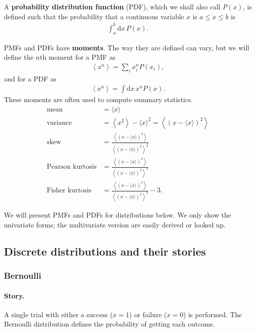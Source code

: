 A \textbf{probability distribution function} (PDF), which we shall
also call $P(x)$, is defined such that the probability that a
continuous variable $x$ is $a \le x \le b$ is
\begin{align}
\int_a^b \mathrm{d}x\,P(x).
\end{align}

PMFs and PDFs have \textbf{moments}.  The way they are defined can
vary, but we will define the $n$th moment for a PMF as
\begin{align}
\left\langle x^n \right\rangle = \sum_i x_i^n P(x_i),
\end{align}
and for a PDF as
\begin{align}
\left\langle x^n \right\rangle = \int \mathrm{d}x\, x^n P(x).
\end{align}
These moments are often used to compute summary statistics.
\begin{align}
\text{mean} &= \langle x \rangle \\
\text{variance} &= \left\langle x^2 \right\rangle - \langle x \rangle^2
= \left\langle(x - \langle x \rangle)^2 \right\rangle \\
\text{skew} &= \frac{\left\langle(x - \langle x \rangle)^3 \right\rangle}
{\left\langle(x - \langle x \rangle)^2 \right\rangle^{\frac{3}{2}}} \\
\text{Pearson kurtosis} &= \frac{\left\langle(x - \langle x \rangle)^4 \right\rangle}
{\left\langle(x - \langle x \rangle)^2 \right\rangle^2} \\
\text{Fisher kurtosis} &= \frac{\left\langle(x - \langle x \rangle)^4 \right\rangle}
{\left\langle(x - \langle x \rangle)^2 \right\rangle^2} - 3.
\end{align}

We will present PMFs and PDFs for distributions below.  We only show
the univariate forms; the multivariate version are easily derived or
looked up.



\subsection{Discrete distributions and their stories}

\subsubsection{Bernoulli}
\paragraph{Story.} A single trial with either a success ($x = 1$) or
failure ($x=0$) is performed.  The Bernoulli distribution defines the
probability of getting each outcome.
